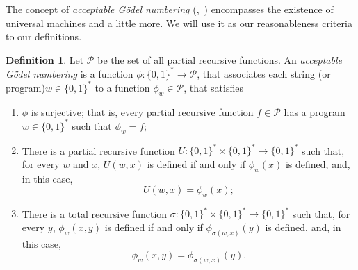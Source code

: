 \documentclass[12pt]{article}
\theoremstyle{definition}
\newtheorem{definition}{Definition}
\begin{document}
The concept of \emph{acceptable Gödel numbering}
(\cite[p.~41]{Rogers1987},~\cite[p.~324]{Blum1967})
encompasses the existence of universal machines and a little more.
We will use it as our reasonableness criteria to our definitions.%

\begin{definition}
    Let $\mathcal P$ be the set of all partial recursive functions.
    An \emph{acceptable Gödel numbering}
    is a function $\phi : \{0, 1\}^* \to \mathcal P$,
    that associates each string (or program)\footnotemark $w \in \{0, 1\}^*$
    to a function $\phi_w \in \mathcal P$,
    that satisfies
    \begin{enumerate}
        \item $\phi$ is surjective;
            that is, every partial recursive function $f \in \mathcal P$
            has a program $w \in \{0, 1\}^*$ such that $\phi_w = f$;
            \label{surjectiveness}
        \item There is a partial recursive function
            $U:\{0, 1\}^* \times \{0, 1\}^* \to \{0, 1\}^*$ such that,
            for every $w$ and $x$,
            $U(w, x)$ is defined if and only if $\phi_w(x)$ is defined,
            and, in this case,
            \begin{equation*}
                U(w, x) = \phi_w(x);
            \end{equation*}
            \label{universal-tm}
        \item There is a total recursive function
            $\sigma:\{0, 1\}^* \times \{0, 1\}^* \to \{0, 1\}^*$ such that,
            for every $y$,
            $\phi_w(x, y)$ is defined if and only if $\phi_{\sigma(w, x)}(y)$ is defined,
            and, in this case,
            \begin{equation*}
                \phi_w(x, y) = \phi_{\sigma(w, x)}(y).
            \end{equation*}
            \label{smn-theorem}
    \end{enumerate}
\end{definition}
\end{document}
